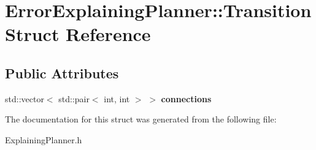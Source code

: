 \section{Error\+Explaining\+Planner\+:\+:Transition Struct Reference}
\label{structErrorExplainingPlanner_1_1Transition}
\subsection*{Public Attributes}
\begin{DoxyCompactItemize}
\item 
std\+::vector$<$ std\+::pair$<$ int, int $>$ $>$ {\bfseries connections}\label{structErrorExplainingPlanner_1_1Transition_aab8932432015b9aa75b703234dbfd059}

\end{DoxyCompactItemize}


The documentation for this struct was generated from the following file\+:\begin{DoxyCompactItemize}
\item 
Explaining\+Planner.\+h\end{DoxyCompactItemize}
